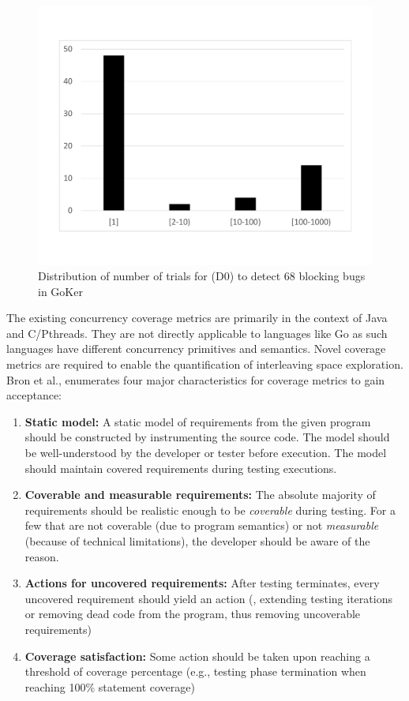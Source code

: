 \begin{figure}[]
\centering
\includegraphics[width=0.8\linewidth]{figs/coverage_motivation.pdf}
\caption{Distribution of number of trials for \goat (D0) to detect 68 blocking bugs in GoKer~\cite{yuan-gobench-cgo21}}
\label{fig:rare_bugs}
\end{figure}


The existing concurrency coverage metrics are primarily in the context of Java and C/Pthreads.
%
They are not directly applicable to languages like Go as such languages have different concurrency primitives and semantics.
%
Novel coverage metrics are required to enable the quantification of interleaving space exploration.
%
Bron et al.,\cite{bron-appSyncCov-ppopp05} enumerates four major characteristics for coverage metrics to gain acceptance:
\begin{enumerate}
  \item \textbf{Static model:} A static model of requirements from the given program should be constructed by instrumenting the source code. The model should be well-understood by the developer or tester before execution. The model should maintain covered requirements during testing executions.
  \item \textbf{Coverable and measurable requirements:} The absolute majority of requirements should be realistic enough to be \textit{coverable} during testing. For a few that are not coverable (due to program semantics) or not \textit{measurable} (because of technical limitations), the developer should be aware of the reason.
  \item \textbf{Actions for uncovered requirements:} After testing terminates, every uncovered requirement should yield an action (\eg, extending testing iterations or removing dead code from the program, thus removing uncoverable requirements)
  \item \textbf{Coverage satisfaction:} Some action should be taken upon reaching a threshold of coverage percentage (e.g., testing phase termination when reaching 100\% statement coverage)
\end{enumerate}

